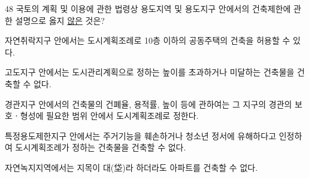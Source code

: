 \begin{question}{48}
국토의 계획 및 이용에 관한 법령상 용도지역 및 용도지구 안에서의 건축제한에 관한 설명으로 옳지 \uline{않은} 것은?
\begin{choices}
  \item 자연취락지구 안에서는 도시계획조례로 10층 이하의 공동주택의 건축을 허용할 수 있다.
  \item 고도지구 안에서는 도시관리계획으로 정하는 높이를 초과하거나 미달하는 건축물을 건축할 수 없다.
  \item 경관지구 안에서의 건축물의 건폐율, 용적률, 높이 등에 관하여는 그 지구의 경관의 보호ㆍ형성에 필요한 범위 안에서 도시계획조례로 정한다.
  \item 특정용도제한지구 안에서는 주거기능을 훼손하거나 청소년 정서에 유해하다고 인정하여 도시계획조례가 정하는 건축물을 건축할 수 없다.
  \item 자연녹지지역에서는 지목이 대(垈)라 하더라도 아파트를 건축할 수 없다.
\end{choices}
\end{question}
